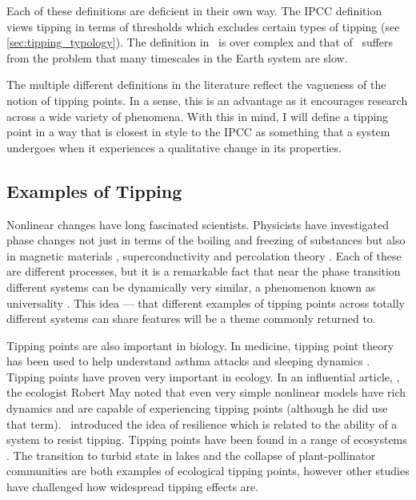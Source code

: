 Each of these definitions are deficient in their own way. The IPCC definition views tipping in terms of thresholds which excludes certain types of tipping (see \cref{sec:tipping_typology}).
The definition in~\cite{Lenton2008} is over complex and that of~\cite{Wang2023} suffers from the problem that many timescales in the Earth system are slow.

The multiple different definitions in the literature reflect the vagueness of the notion of tipping points. In a sense, this is an advantage as it encourages research across a wide variety
of phenomena. With this in mind, I will define a tipping point in a way that is closest in style to the IPCC as 
something that a system undergoes when it experiences a qualitative change in its properties.

\subsection{Examples of Tipping}

Nonlinear changes have long fascinated scientists. Physicists have investigated phase changes not just in terms of the boiling and freezing of substances but also
in magnetic materials \parencite{Ising1925,Onsager1944}, superconductivity \parencite{Landau1965} and percolation theory \parencite{Flory1941}. Each of these are different processes, but it is a
remarkable fact that near the phase transition different systems can be dynamically very similar, a phenomenon known as universality \parencite{Wilson1983}. This idea --- that different examples
of tipping points across totally different systems can share features will be a theme commonly returned to.

Tipping points are also important in biology. In medicine, tipping point theory has been used to help understand asthma attacks \parencite{Donovan2022} and sleeping dynamics \parencite{Skeldon2014}.
Tipping points have proven very important in ecology. In an influential article, \parencite{May1976}, the ecologist Robert May noted that even very simple nonlinear models have rich dynamics and are capable
of experiencing tipping points (although he did use that term).~\cite{Holling1973} introduced the idea of resilience which is related to the ability of a system to resist tipping. Tipping points have
been found in a range of ecosystems \parencite{Scheffer2001,Dakos2019}. The transition to turbid state in lakes \parencite{Scheffer1993} and the collapse of plant-pollinator communities
\parencite{Lever2014} are both examples of ecological tipping points, however other studies \parencite{Hillebrand2020} have challenged how widespread tipping effects are.

